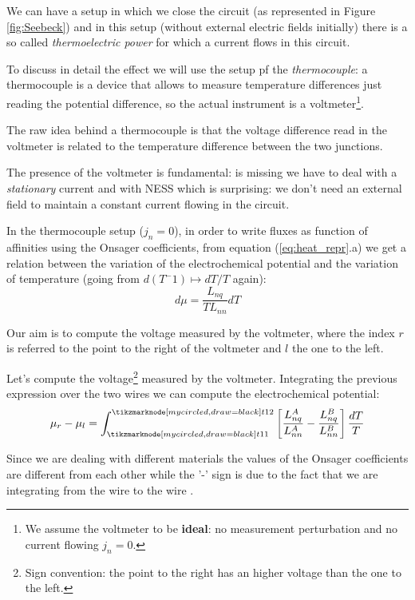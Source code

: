 \documentclass[\main/main.tex]{subfiles}
\begin{document}
\begin{enumerate}
We can have a setup in which we close the circuit (as represented in Figure \ref{fig:Seebeck}) and in this setup (without external electric fields initially) there is a so called \textit{thermoelectric power} for which a current flows in this circuit.

To discuss in detail the effect we will use the setup pf the \textit{thermocouple}: a thermocouple is a device that allows to measure temperature differences just reading the potential difference, so the actual instrument is a voltmeter\footnote{We assume the voltmeter to be \textbf{ideal}: no measurement perturbation and no current flowing $j_n=0$.}. 


\begin{appr}
The raw idea behind a thermocouple is that the voltage difference read in the voltmeter is related to the temperature difference between the two junctions.

The presence of the voltmeter is fundamental: is missing we have to deal with a \textit{stationary} current and with NESS which is surprising: we don't need an external field to maintain a constant current flowing in the circuit.
\end{appr}

In the thermocouple setup ($j_n=0$), in order to write fluxes as function of affinities using the Onsager coefficients, from equation (\ref{eq:heat_repr}.a) we get a relation between the variation of the electrochemical potential and the variation of temperature (going from $d(T^-1)\mapsto dT/T$ again):
\begin{equation}
    d \mu=\frac{L_{n q}}{T L_{n n}} d T
\end{equation}

Our aim is to compute the voltage measured by the voltmeter, where the index $r$ is referred to the point to the right of the voltmeter and $l$ the one to the left.

Let's compute the voltage\footnote{Sign convention: the point to the right has an higher voltage than the one to the left.} measured by the voltmeter. Integrating the previous expression over the two wires we can compute the electrochemical potential:
\begin{equation}
    \mu_r-\mu_l = \int_{\circled{1}}^{\circled{2}} \left[ \frac{L^A_{nq}}{L^A_{nn}} -\frac{L^B_{nq}}{L_{nn}^B}\right]\frac{dT}{T}
\end{equation}

Since we are dealing with different materials the values of the Onsager coefficients are different from each other while the '-' sign is due to the fact that we are integrating from the wire  to the wire .


\end{enumerate}
\end{document}
